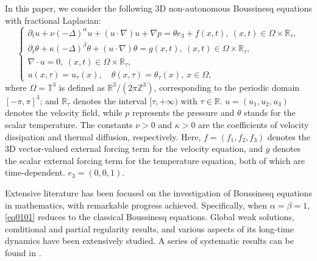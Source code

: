 \documentclass[oneside,preprint,12pt,numbers,sort&compress]{elsarticle}
\begin{document}
In this paper, we consider the following 3D non-autonomous Boussinesq equations with fractional Laplacian:
\begin{equation}\label{eq0101}
\begin{cases}
\partial_{t}u+\nu(-\Delta)^{\alpha}u+(u\cdot\nabla)u+\nabla p = \theta e_3 + f(x,t),\ (x,t)\in \Omega \times \mathbb{R}_{\tau}, \\
\partial_{t}\theta+\kappa(-\Delta)^{\beta}\theta+(u\cdot\nabla)\theta = g(x,t),\ (x,t)\in \Omega \times \mathbb{R}_{\tau}, \\
\nabla\cdot u = 0,\ (x,t)\in \Omega \times \mathbb{R}_{\tau},  \\
u(x,\tau) = u_\tau(x), \quad \theta(x,\tau) = \theta_\tau(x),\ x \in \Omega, 
\end{cases}
\end{equation}
where $\Omega = \mathbb{T}^3$ is defined as \(\mathbb{R}^3/(2\pi\mathbb{Z}^3)\), corresponding to the periodic domain \([-\pi, \pi]^3\); and \(\mathbb{R}_{\tau}\) denotes the interval \([\tau, +\infty)\) with \(\tau \in \mathbb{R}\). $u=(u_1,u_2,u_3)$ denotes the velocity field, while $p$ represents the pressure and $\theta$ stands for the scalar temperature. The constants $\nu>0$ and $\kappa>0$ are the coefficients
of velocity dissipation and thermal diffusion, respectively. Here, \(f = (f_1, f_2, f_3)\) denotes the 3D vector-valued external forcing term for the velocity equation, and \(g\) denotes the scalar external forcing term for the temperature equation, both of which are time-dependent. $e_3=(0,0,1)$. 

Extensive literature has been focused on the investigation of Boussinesq equations in mathematics, with remarkable progress achieved. Specifically, when $\alpha = \beta = 1$, \cref{eq0101} reduces to the classical Boussinesq equations. Global weak solutions, conditional and partial regularity results, and various aspects of its long-time dynamics have been extensively studied. A series of systematic results can be found in \cite{BS2004,CRT2004,WangXM2007,AH2007,GR2020}.
\end{document}
